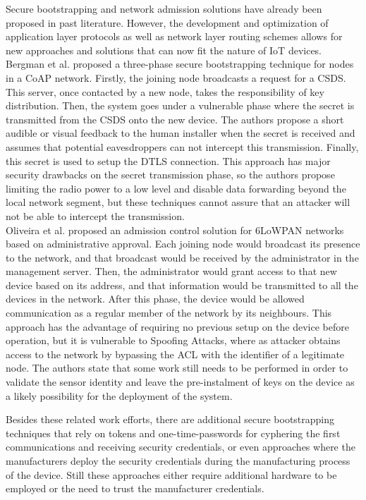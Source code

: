 \documentclass{llncs}
\begin{document}
Secure bootstrapping and network admission solutions have already been proposed in past literature. 
However, the development and optimization of application layer protocols as well as network layer routing schemes allows for new approaches and solutions that can now fit the nature of \ac{IoT} devices.
Bergman et al.\cite{Bergmann2012} proposed a three-phase secure bootstrapping technique for nodes in a \ac{CoAP} network. 
Firstly, the joining node broadcasts a request for a \ac{CSDS}. 
This server, once contacted by a new node, takes the responsibility of key distribution. 
Then, the system goes under a vulnerable phase where the secret is transmitted from the \ac{CSDS} onto the new device. 
The authors propose a short audible or visual feedback to the human installer when the secret is received and assumes that potential eavesdroppers can not intercept this transmission. 
Finally, this secret is used to setup the \ac{DTLS} connection. 
This approach has major security drawbacks on the secret transmission phase, so the authors propose limiting the radio power to a low level and disable data forwarding beyond the local network segment, but these techniques cannot assure that an attacker will not be able to intercept the transmission.\\
Oliveira et al. \cite{Oliveira2013} proposed an admission control solution for 6LoWPAN networks based on administrative approval. 
Each joining node would broadcast its presence to the network, and that broadcast would be received by the administrator in the management server. 
Then, the administrator would grant access to that new device based on its address, and that information would be transmitted to all the devices in the network. 
After this phase, the device would be allowed communication as a regular member of the network by its neighbours. 
This approach has the advantage of requiring no previous setup on the device before operation, but it is vulnerable to Spoofing Attacks, where as attacker obtains access to the network by bypassing the \ac{ACL} with the identifier of a legitimate node.
The authors state that some work still needs to be performed in order to validate the sensor identity and leave the pre-instalment of keys on the device as a likely possibility for the deployment of the system. 

Besides these related work efforts, there are additional secure bootstrapping techniques \cite{Fischer2012} that rely on tokens and one-time-passwords for cyphering the first communications and receiving security credentials, or even approaches where the manufacturers deploy the security credentials during the manufacturing process of the device. 
Still these approaches either require additional hardware to be employed or the need to trust the manufacturer credentials.\\
\end{document}

